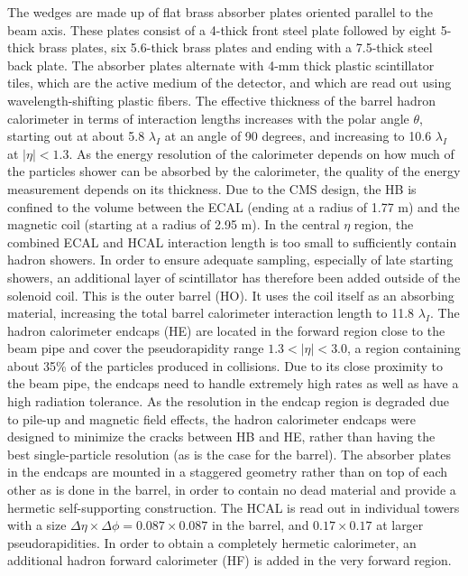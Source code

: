 The wedges are made up of flat brass absorber plates oriented parallel to the beam axis. These plates consist of a 4-\cm thick front steel plate followed by eight 5-\cm thick brass plates, six 5.6-\cm thick brass plates and ending with a 7.5-\cm thick steel back plate. The absorber plates alternate with 4-mm thick plastic scintillator tiles, which are the active medium of the detector, and which are read out using wavelength-shifting plastic fibers. The effective thickness of the barrel hadron calorimeter in terms of interaction lengths increases with the polar angle $\theta$, starting out at about 5.8 $\lambda_I$ at an angle of 90 degrees, and increasing to 10.6 $\lambda_I$ at $|\eta|<1.3$.
As the energy resolution of the calorimeter depends on how much of the particles shower can be absorbed by the calorimeter, the quality of the energy measurement depends on its thickness. Due to the CMS design, the HB is confined to the volume between the ECAL (ending at a radius of 1.77 m) and the magnetic coil (starting at a radius of 2.95 m).
In the central $\eta$ region, the combined ECAL and HCAL interaction length is too small to sufficiently contain hadron showers. 
In order to ensure adequate sampling, especially of late starting showers, an additional layer of scintillator has therefore been added outside of the solenoid coil. This is the outer barrel (HO). It uses the coil itself as an absorbing material, increasing the total barrel calorimeter interaction length to 11.8 $\lambda_I$.
The hadron calorimeter endcaps (HE) are located in the forward region close to the beam pipe and cover the pseudorapidity range $1.3 < |\eta|< 3.0$, a region containing about 35\% of the particles produced in collisions. Due to its close proximity to the beam pipe, the endcaps need to handle extremely high rates as well as have a high radiation tolerance.
As the resolution in the endcap region is degraded due to pile-up and magnetic field effects, the hadron calorimeter endcaps were designed to minimize the cracks between HB and HE, rather than having the best single-particle resolution (as is the case for the barrel).
The absorber plates in the endcaps are mounted in a staggered geometry rather than on top of each other as is done in the barrel, in order to contain no dead material and provide a hermetic self-supporting construction.
The HCAL is read out in individual towers with a size $\Delta \eta \times \Delta \phi = 0.087 \times 0.087$ in the barrel, and $0.17 \times 0.17$ at larger pseudorapidities. 
In order to obtain a completely hermetic calorimeter, an additional hadron forward calorimeter (HF) is added in the very forward region.
